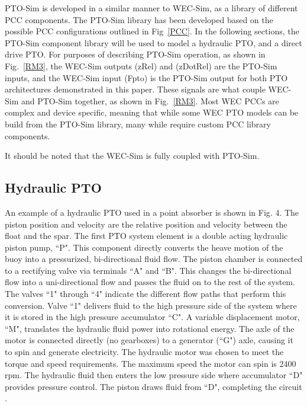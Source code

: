 \documentclass[twocolumn,10pt]{asme2e}
\begin{document}
PTO-Sim is developed in a similar manner to WEC-Sim, as a library of different PCC components. The PTO-Sim library has been developed based on the possible PCC configurations outlined in Fig~\ref{PCC}. In the following sections, the PTO-Sim component library will be used to model a hydraulic PTO, and a direct drive PTO. For purposes of describing PTO-Sim operation, as shown in Fig.~\ref{RM3}, the WEC-Sim outputs (zRel) and (zDotRel) are the PTO-Sim inputs, and the WEC-Sim input (Fpto) is the PTO-Sim output for both PTO architectures demonstrated in this paper.  These signals are what couple WEC-Sim and PTO-Sim together, as shown in Fig.~\ref{RM3}. Most WEC PCCs are complex and device specific, meaning that while some WEC PTO models can be build from the PTO-Sim library, many while require custom PCC library components. 

It should be noted that the WEC-Sim is fully coupled with PTO-Sim. 




\subsection*{Hydraulic PTO}
An example of a hydraulic PTO used in a point absorber is shown in Fig. 4.  The piston position and velocity are the relative position and velocity between the float and the spar. The first PTO system element is a double acting hydraulic piston pump, ``P". This component directly converts the heave motion of the buoy into a pressurized, bi-directional fluid flow. The piston chamber is connected to a rectifying valve via terminals ``A" and ``B". This changes the bi-directional flow into a uni-directional flow and passes the fluid on to the rest of the system. The valves ``1" through ``4" indicate the different flow paths that perform this conversion. Valve ``1" delivers fluid to the high pressure side of the system where it is stored in the high pressure accumulator ``C". A variable displacement motor, ``M", translates the hydraulic fluid power into rotational energy. The axle of the motor is connected directly (no gearboxes) to a generator (``G") axle, causing it to spin and generate electricity. The hydraulic motor was chosen to meet the torque and speed requirements. The maximum speed the motor can spin is 2400 rpm.
The hydraulic fluid then enters the low pressure side where accumulator ``D" provides pressure control. The piston draws fluid from ``D", completing the circuit \cite{casey2013modeling}.
\end{document}
